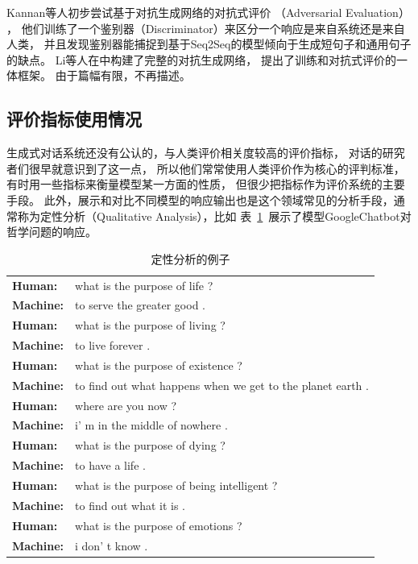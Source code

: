 Kannan等人初步尝试基于对抗生成网络的对抗式评价
（Adversarial Evaluation） ，
他们训练了一个鉴别器（Discriminator）来区分一个响应是来自系统还是来自人类，
并且发现鉴别器能捕捉到基于Seq2Seq的模型倾向于生成短句子和通用句子的缺点。
Li等人在中构建了完整的对抗生成网络，
提出了训练和对抗式评价的一体框架。
由于篇幅有限，不再描述。


\subsection{评价指标使用情况}\label{subsec:metrics_usage}
生成式对话系统还没有公认的，与人类评价相关度较高的评价指标，
对话的研究者们很早就意识到了这一点，
所以他们常常使用人类评价作为核心的评判标准，有时用一些指标来衡量模型某一方面的性质，
但很少把指标作为评价系统的主要手段。
此外，展示和对比不同模型的响应输出也是这个领域常见的分析手段，通常称为定性分析（Qualitative Analysis），比如
表~\ref{tab:qualitative_analysis}~展示了模型GoogleChatbot对哲学问题的响应。
\begin{table}
    \centering
    \caption{定性分析的例子}
    \label{tab:qualitative_analysis}
    \begin{tabular}{ll}
        \toprule
        \midrule
        \textbf{Human:} & what is the purpose of life ? \\
        \textbf{Machine:} & to serve the greater good .\\
        \midrule
        \textbf{Human:} & what is the purpose of living ? \\
        \textbf{Machine:} & to live forever . \\
        \midrule
        \textbf{Human:} & what is the purpose of existence ? \\
        \textbf{Machine:} & to find out what happens when we get to the planet earth . \\
        \midrule
        \textbf{Human:} & where are you now ? \\
        \textbf{Machine:} & i' m in the middle of nowhere . \\
        \midrule
        \textbf{Human:} & what is the purpose of dying ? \\
        \textbf{Machine:} & to have a life . \\
        \midrule
        \textbf{Human:} & what is the purpose of being intelligent ? \\
        \textbf{Machine:} & to find out what it is . \\
        \midrule
        \textbf{Human:} & what is the purpose of emotions ? \\
        \textbf{Machine:} & i don' t know . \\
        \bottomrule
    \end{tabular}
\end{table}

